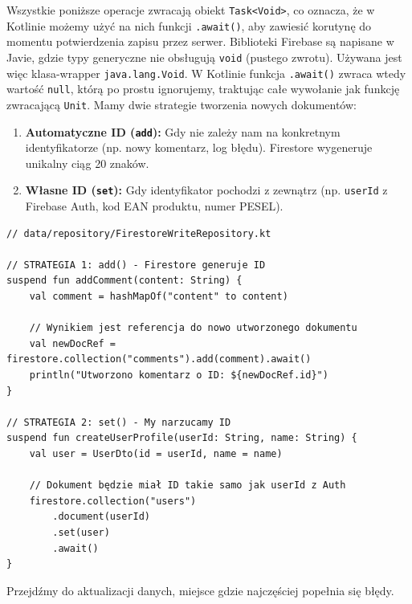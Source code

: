 Wszystkie poniższe operacje zwracają obiekt \texttt{Task<Void>}, co oznacza, że w Kotlinie możemy użyć na nich funkcji \texttt{.await()}, aby zawiesić korutynę do momentu potwierdzenia zapisu przez serwer. Biblioteki Firebase są napisane w Javie, gdzie typy generyczne nie obsługują \texttt{void} (pustego zwrotu). Używana jest więc klasa-wrapper \texttt{java.lang.Void}. W Kotlinie funkcja \texttt{.await()} zwraca wtedy wartość \texttt{null}, którą po prostu ignorujemy, traktując całe wywołanie jak funkcję zwracającą \texttt{Unit}. Mamy dwie strategie tworzenia nowych dokumentów:

\begin{enumerate}
    \item \textbf{Automatyczne ID (\texttt{add}):}
    Gdy nie zależy nam na konkretnym identyfikatorze (np. nowy komentarz, log błędu). Firestore wygeneruje unikalny ciąg 20 znaków.
    
    \item \textbf{Własne ID (\texttt{set}):}
    Gdy identyfikator pochodzi z zewnątrz (np. \texttt{userId} z Firebase Auth, kod EAN produktu, numer PESEL).
\end{enumerate}

\begin{verbatim}
// data/repository/FirestoreWriteRepository.kt

// STRATEGIA 1: add() - Firestore generuje ID
suspend fun addComment(content: String) {
    val comment = hashMapOf("content" to content)
    
    // Wynikiem jest referencja do nowo utworzonego dokumentu
    val newDocRef = firestore.collection("comments").add(comment).await()
    println("Utworzono komentarz o ID: ${newDocRef.id}")
}

// STRATEGIA 2: set() - My narzucamy ID
suspend fun createUserProfile(userId: String, name: String) {
    val user = UserDto(id = userId, name = name)
    
    // Dokument będzie miał ID takie samo jak userId z Auth
    firestore.collection("users")
        .document(userId)
        .set(user)
        .await()
}
\end{verbatim}

Przejdźmy do aktualizacji danych, miejsce gdzie najczęściej popełnia się błędy.

